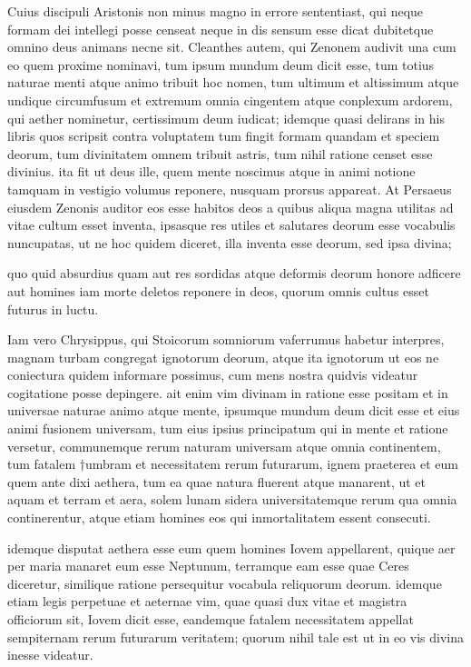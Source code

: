  Cuius discipuli Aristonis non minus magno in errore sententiast, qui neque formam dei intellegi posse censeat neque in dis sensum esse dicat dubitetque omnino deus animans necne sit. Cleanthes autem, qui Zenonem audivit una cum eo quem proxime nominavi, tum ipsum mundum deum dicit esse, tum totius naturae menti atque animo tribuit hoc nomen, tum ultimum et altissimum atque undique circumfusum et extremum omnia cingentem atque conplexum ardorem, qui aether nominetur, certissimum deum iudicat; idemque quasi delirans in his libris quos scripsit contra voluptatem tum fingit formam quandam et speciem deorum, tum divinitatem omnem tribuit astris, tum nihil ratione censet esse divinius. ita fit ut deus ille, quem mente noscimus atque in animi notione tamquam in vestigio volumus reponere, nusquam prorsus appareat. At Persaeus eiusdem Zenonis auditor eos esse habitos deos a quibus aliqua magna utilitas ad vitae cultum esset inventa, ipsasque res utiles et salutares deorum esse vocabulis nuncupatas, ut ne hoc quidem diceret, illa inventa esse deorum, sed ipsa divina;

 quo quid absurdius quam aut res sordidas atque deformis deorum honore adficere aut homines iam morte deletos reponere in deos, quorum omnis cultus esset futurus in luctu.

 Iam vero Chrysippus, qui Stoicorum somniorum vaferrumus habetur interpres, magnam turbam congregat ignotorum deorum, atque ita ignotorum ut eos ne coniectura quidem informare possimus, cum mens nostra quidvis videatur cogitatione posse depingere. ait enim vim divinam in ratione esse positam et in universae naturae animo atque mente, ipsumque mundum deum dicit esse et eius animi fusionem universam, tum eius ipsius principatum qui in mente et ratione versetur, communemque rerum naturam universam atque omnia continentem, tum fatalem †umbram et necessitatem rerum futurarum, ignem praeterea et eum quem ante dixi aethera, tum ea quae natura fluerent atque manarent, ut et aquam et terram et aera, solem lunam sidera universitatemque rerum qua omnia continerentur, atque etiam homines eos qui inmortalitatem essent consecuti.

 idemque disputat aethera esse eum quem homines Iovem appellarent, quique aer per maria manaret eum esse Neptunum, terramque eam esse quae Ceres diceretur, similique ratione persequitur vocabula reliquorum deorum. idemque etiam legis perpetuae et aeternae vim, quae quasi dux vitae et magistra officiorum sit, Iovem dicit esse, eandemque fatalem necessitatem appellat sempiternam rerum futurarum veritatem; quorum nihil tale est ut in eo vis divina inesse videatur.


